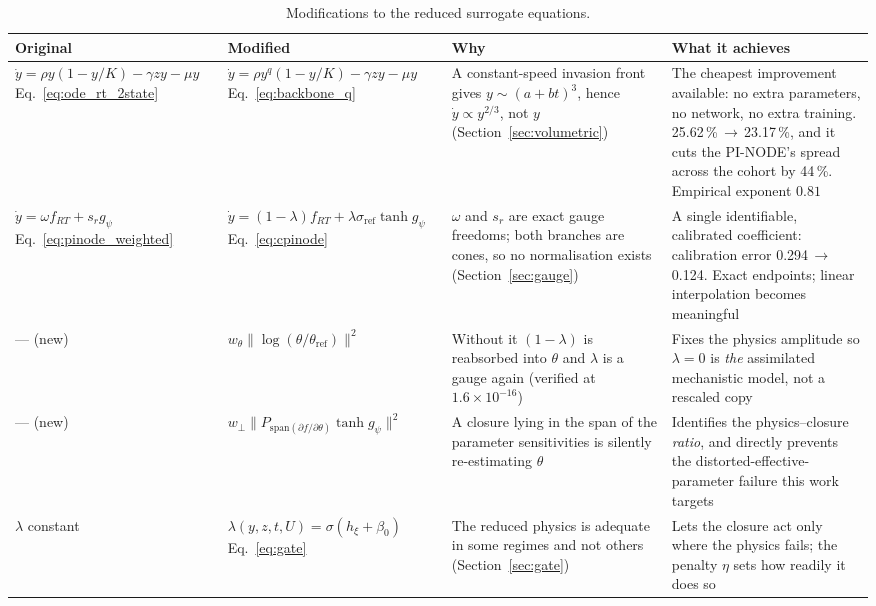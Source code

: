 \begin{table}[H]
\caption{Modifications to the reduced surrogate equations.}
\label{tab:changes}
\centering\scriptsize
\setlength{\tabcolsep}{3pt}
\renewcommand{\arraystretch}{1.15}
\begin{tabular}{p{2.3cm} p{3.4cm} p{2.9cm} p{3.1cm}}
\hline
\textbf{Original} & \textbf{Modified} & \textbf{Why} & \textbf{What it achieves} \\
\hline

$\dot y=\rho y(1-y/K)-\gamma zy-\mu y$
\newline Eq.~\eqref{eq:ode_rt_2state}
&
$\dot y=\rho y^{q}(1-y/K)-\gamma zy-\mu y$
\newline Eq.~\eqref{eq:backbone_q}
&
A constant-speed invasion front gives $y\sim(a+bt)^{3}$, hence
$\dot y\propto y^{2/3}$, not $y$ (Section~\ref{sec:volumetric})
&
The cheapest improvement available: no extra parameters, no network,
no extra training. 25.62\,\%\,$\to$\,23.17\,\%, and it cuts the
PI-NODE's spread across the cohort by 44\,\%. Empirical exponent $0.81$
\\
\hline

$\dot y=\omega f_{RT}+s_{r}g_{\psi}$
\newline Eq.~\eqref{eq:pinode_weighted}
&
$\dot y=(1-\lambda)f_{RT}+\lambda\sigma_{\mathrm{ref}}\tanh g_{\psi}$
\newline Eq.~\eqref{eq:cpinode}
&
$\omega$ and $s_{r}$ are exact gauge freedoms; both branches are cones, so no
normalisation exists (Section~\ref{sec:gauge})
&
A single identifiable, calibrated coefficient: calibration error
0.294\,$\to$\,0.124. Exact endpoints; linear interpolation becomes
meaningful
\\
\hline

--- (new)
&
$w_{\theta}\|\log(\theta/\theta_{\mathrm{ref}})\|^{2}$
&
Without it $(1-\lambda)$ is reabsorbed into $\theta$ and $\lambda$ is a gauge
again (verified at $1.6\times10^{-16}$)
&
Fixes the physics amplitude so $\lambda=0$ is \emph{the} assimilated
mechanistic model, not a rescaled copy
\\
\hline

--- (new)
&
$w_{\perp}\|P_{\mathrm{span}(\partial f/\partial\theta)}\tanh g_{\psi}\|^{2}$
&
A closure lying in the span of the parameter sensitivities is silently
re-estimating $\theta$
&
Identifies the physics--closure \emph{ratio}, and directly prevents the
distorted-effective-parameter failure this work targets
\\
\hline

$\lambda$ constant
&
$\lambda(y,z,t,U)=\sigma(h_{\xi}+\beta_{0})$
\newline Eq.~\eqref{eq:gate}
&
The reduced physics is adequate in some regimes and not others
(Section~\ref{sec:gate})
&
Lets the closure act only where the physics fails; the penalty $\eta$ sets how
readily it does so
\\
\hline


\end{tabular}
\end{table}

